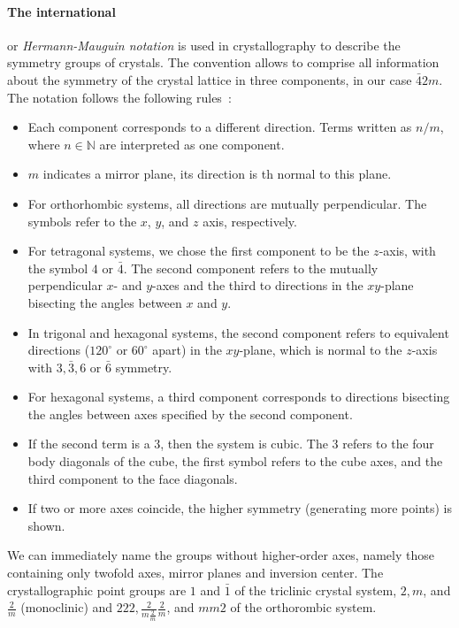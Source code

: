 \paragraph{The international} or \emph{Hermann-Mauguin notation} 
is used in crystallography to describe the symmetry groups of crystals. 
The convention allows to comprise all information about the symmetry 
of the crystal lattice in three components, in our case $\bar{4}2m$. 
The notation follows the following rules~\cite{sands1993introduction}:
\begin{itemize}
    \item
    Each component corresponds to a different direction. Terms 
    written as $n/m$, where $n \in \mathbb{N}$ are interpreted 
    as one component. 
    \item
    $m$ indicates a mirror plane, its direction is th normal to this plane.
    \item
    For orthorhombic systems, all directions are mutually perpendicular. 
    The symbols refer to the $x$, $y$, and $z$ axis, respectively.
    \item
    For tetragonal systems, we chose the first component to be the $z$-axis, 
    with the symbol $4$ or $\bar{4}$. The second component refers to the 
    mutually perpendicular $x$- and $y$-axes and the third to directions in the 
    $xy$-plane bisecting the angles between $x$ and $y$. 
    \item
    In trigonal and hexagonal systems, the second component refers to 
    equivalent directions ($120^\circ$ or $60^\circ$ apart) in the $xy$-plane, 
    which is normal to the $z$-axis with $3, \bar{3}, 6$ or $\bar{6}$ symmetry. 
    \item
    For hexagonal systems, a third component corresponds to directions bisecting 
    the angles between axes specified by the second component. 
    \item
    If the second term is a $3$, then the system is cubic. The $3$ refers to the 
    four body diagonals of the cube, the first symbol refers to the cube axes, and the 
    third component to the face diagonals.
    \item
    If two or more axes coincide, the higher symmetry (generating more points) is 
    shown. 
\end{itemize}
We can immediately name the groups without higher-order axes, namely those 
containing only twofold axes, mirror planes and inversion center. The 
crystallographic point groups are $1$ and $\bar{1}$ of the 
triclinic crystal system, $2, m$, and $\frac{2}{m}$ (monoclinic) and 
$222, \frac{2}{m\frac{2}{m}}\frac{2}{m}$, and $mm2$ of the orthorombic system. 

